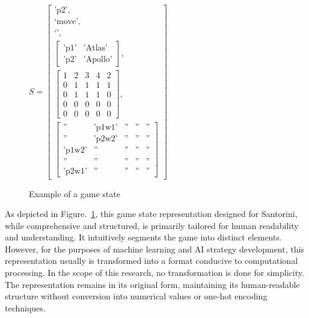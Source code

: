 \documentclass{telkomnika}
\begin{document}
\begin{figure}[!ht]
\centering
\(S = 
\left[
    \begin{array}{l}
        \text{'p2'}, \\
        \text{`move'}, \\
        \text{`'}, \\
        \left[ \begin{array}{ll} \text{'p1'} & \text{'Atlas'} \\ \text{'p2'} & \text{'Apollo'} \end{array} \right], \\
        \left[ 
    \begin{array}{ccccc} 
        1 & 2 & 3 & 4 & 2 \\
        0 & 1 & 1 & 1 & 1 \\
        0 & 1 & 1 & 1 & 0 \\
        0 & 0 & 0 & 0 & 0 \\
        0 & 0 & 0 & 0 & 0
    \end{array}\right], \\
    \left[ 
        \begin{array}{ccccc} 
            \text{''} & \text{'p1w1'} & \text{''} & \text{''} & \text{''} \\ 
            \text{''} & \text{'p2w2'} & \text{''} & \text{''} & \text{''} \\ 
            \text{'p1w2'} & \text{''} & \text{''} & \text{''} & \text{''} \\ 
            \text{''} & \text{''} & \text{''} & \text{''} & \text{''} \\ 
            \text{'p2w1'} & \text{''} & \text{''} & \text{''} & \text{''}
        \end{array} \right]
\end{array}
\right]\)\par
\caption{Example of a game state}
\label{fig:game-state}
\end{figure}

As depicted in Figure.~\ref{fig:game-state}, this game state representation designed for Santorini, while comprehensive and structured, is primarily tailored for human readability and understanding. It intuitively segments the game into distinct elements. However, for the purposes of machine learning and AI strategy development, this representation usually is transformed into a format conducive to computational processing. In the scope of this research, no transformation is done for simplicity. The representation remains in its original form, maintaining its human-readable structure without conversion into numerical values or one-hot encoding techniques.
\end{document}
